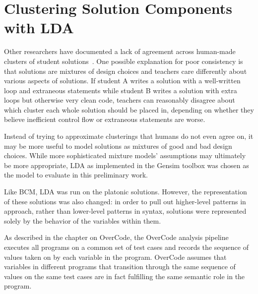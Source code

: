 \section{Clustering Solution Components with LDA}

Other researchers have documented a lack of agreement across human-made clusters of student solutions~\cite{ACESthesis}. One possible explanation for poor consistency is that solutions are mixtures of design choices and teachers care differently about various aspects of solutions. If student A writes a solution with a well-written loop and extraneous statements while student B writes a solution with extra loops but otherwise very clean code, teachers can reasonably disagree about which cluster each whole solution should be placed in, depending on whether they believe inefficient control flow or extraneous statements are worse.

Instead of trying to approximate clusterings that humans do not even agree on, it may be more useful to model solutions as mixtures of good and bad design choices. While more sophisticated mixture models' assumptions may ultimately be more appropriate, LDA \cite{lda} as implemented in the Gensim toolbox \cite{gensim} was chosen as the model to evaluate in this preliminary work. 

Like BCM, LDA was run on the platonic solutions. However, the representation of these solutions was also changed: in order to pull out higher-level patterns in approach, rather than lower-level patterns in syntax, solutions were represented solely by the behavior of the variables within them. 

As described in the chapter on OverCode, the OverCode analysis pipeline executes all programs on a common set of test cases and records the sequence of values taken on by each variable in the program. OverCode assumes that variables in different programs that transition through the same sequence of values on the same test cases are in fact fulfilling the same semantic role in the program. %



